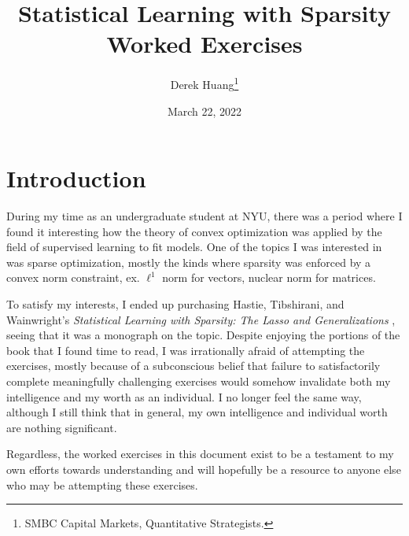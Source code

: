 \documentclass{article}
\title{Statistical Learning with Sparsity \\ \Large Worked Exercises}
\author{Derek Huang\thanks{SMBC Capital Markets, Quantitative Strategists.}}
\date{March 22, 2022}
\numberwithin{equation}{section}
\begin{document}
\newcommand{\newtocsubsection}[1]{%
    \subsection*{#1} \addcontentsline{toc}{subsection}{#1}%
}

\maketitle


\tableofcontents

\newpage

\section{Introduction}

During my time as an undergraduate student at NYU, there was a period where
I found it interesting how the theory of convex optimization was applied by
the field of supervised learning to fit models. One of the topics I was
interested in was sparse optimization, mostly the kinds where sparsity was
enforced by a convex norm constraint, ex. $ \ell^1 $ norm for vectors,
nuclear norm for matrices.

\medskip

To satisfy my interests, I ended up purchasing Hastie, Tibshirani, and
Wainwright's \textit{%
    Statistical Learning with Sparsity: The Lasso and Generalizations%
}, seeing that it was a monograph on the topic. Despite enjoying the portions
of the book that I found time to read, I was irrationally afraid of
attempting the exercises, mostly because of a subconscious belief that failure
to satisfactorily complete meaningfully challenging exercises would somehow
invalidate both my intelligence and my worth as an individual. I no longer
feel the same way, although I still think that in general, my own intelligence
and individual worth are nothing significant.

\medskip

Regardless, the worked exercises in this document exist to be a testament
to my own efforts towards understanding and will hopefully be a resource to
anyone else who may be attempting these exercises.

\medskip

\end{document}
